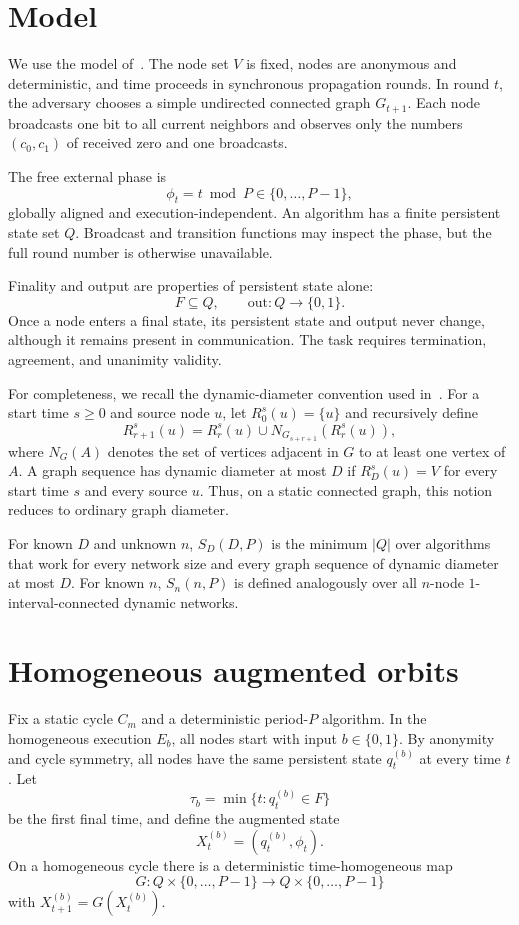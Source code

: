 \documentclass[11pt]{article}
\theoremstyle{remark}
\begin{document}
\section{Model}

We use the model of~\cite{yonezu2026statephase}.  The node set $V$ is fixed, nodes are anonymous and deterministic, and time proceeds in synchronous propagation rounds.  In round $t$, the adversary chooses a simple undirected connected graph $G_{t+1}$.  Each node broadcasts one bit to all current neighbors and observes only the numbers $(c_0,c_1)$ of received zero and one broadcasts.

The free external phase is
\[
\phi_t=t\bmod P\in\{0,\ldots,P-1\},
\]
globally aligned and execution-independent.  An algorithm has a finite persistent state set $Q$.  Broadcast and transition functions may inspect the phase, but the full round number is otherwise unavailable.

Finality and output are properties of persistent state alone:
\[
F\subseteq Q,\qquad \mathrm{out}:Q\to\{0,1\}.
\]
Once a node enters a final state, its persistent state and output never change, although it remains present in communication.  The task requires termination, agreement, and unanimity validity.

For completeness, we recall the dynamic-diameter convention used in~\cite{yonezu2026statephase}.  For a start time $s\ge0$ and source node $u$, let $R^s_0(u)=\{u\}$ and recursively define
\[
R^s_{r+1}(u)=R^s_r(u)\cup N_{G_{s+r+1}}(R^s_r(u)),
\]
where $N_G(A)$ denotes the set of vertices adjacent in $G$ to at least one vertex of $A$.  A graph sequence has dynamic diameter at most $D$ if $R^s_D(u)=V$ for every start time $s$ and every source $u$.  Thus, on a static connected graph, this notion reduces to ordinary graph diameter.

For known $D$ and unknown $n$, $S_D(D,P)$ is the minimum $|Q|$ over algorithms that work for every network size and every graph sequence of dynamic diameter at most $D$.  For known $n$, $S_n(n,P)$ is defined analogously over all $n$-node $1$-interval-connected dynamic networks.

\section{Homogeneous augmented orbits}

Fix a static cycle $C_m$ and a deterministic period-$P$ algorithm.  In the homogeneous execution $E_b$, all nodes start with input $b\in\{0,1\}$.  By anonymity and cycle symmetry, all nodes have the same persistent state $q_t^{(b)}$ at every time $t$.  Let
\[
\tau_b=\min\{t:q_t^{(b)}\in F\}
\]
be the first final time, and define the augmented state
\[
X_t^{(b)}=(q_t^{(b)},\phi_t).
\]
On a homogeneous cycle there is a deterministic time-homogeneous map
\[
G:Q\times\{0,\ldots,P-1\}\to Q\times\{0,\ldots,P-1\}
\]
with $X_{t+1}^{(b)}=G(X_t^{(b)})$.
\end{document}
